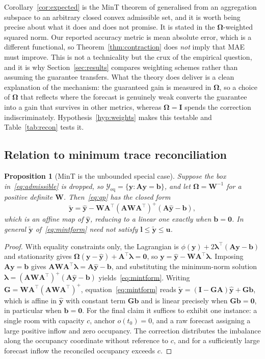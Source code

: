 \documentclass[11pt]{article}
\theoremstyle{plain}
\newtheorem{proposition}[theorem]{Proposition}
\theoremstyle{definition}
\theoremstyle{remark}
\newcommand{\bA}{\bm{A}}
\newcommand{\by}{\bm{y}}
\newcommand{\bb}{\bm{b}}
\newcommand{\bOm}{\bm{\Omega}}
\newcommand{\yhat}{\hat{\by}}
\newcommand{\ytil}{\tilde{\by}}
\newcommand{\cY}{\mathcal{Y}}
\newif\ifrevisionmarkup
\newcommand{\new}[1]{\ifrevisionmarkup\textcolor{revision}{#1}\else#1\fi}
\begin{document}
Corollary~\ref{cor:expected} is the MinT theorem of \citet{wickramasuriya2019mint} generalised from an aggregation subspace to an arbitrary closed convex admissible set, and it is worth being precise about what it does and does not promise. It is stated in the $\bOm$-weighted squared norm. Our reported accuracy metric is mean absolute error, which is a different functional, so Theorem~\ref{thm:contraction} does \emph{not} imply that MAE must improve. This is not a technicality but the crux of the empirical question, and it is why Section~\ref{sec:results} compares weighting schemes rather than assuming the guarantee transfers. What the theory does deliver is a clean explanation of the mechanism: the guaranteed gain is measured in $\bOm$, so a choice of $\bOm$ that reflects where the forecast is genuinely weak converts the guarantee into a gain that survives in other metrics, whereas $\bOm = \bm{I}$ spends the correction indiscriminately. Hypothesis~\ref{hyp:weights} makes this testable and Table~\ref{tab:recon} tests it.

\subsection{Relation to minimum trace reconciliation}

\begin{proposition}[MinT is the unbounded special case]
\label{prop:mint}
Suppose the box in~\eqref{eq:admissible} is dropped, so $\cY_{\mathrm{eq}} = \{\by : \bA\by=\bb\}$, and let $\bOm = \bm{W}^{-1}$ for a positive definite $\bm{W}$. Then~\eqref{eq:qp} has the closed form
\begin{equation}
\ytil = \yhat - \bm{W}\bA^{\top}\left(\bA\bm{W}\bA^{\top}\right)^{+}\left(\bA\yhat - \bb\right),
\label{eq:mintform}
\end{equation}
which is an \new{affine} map of $\yhat$, \new{reducing to a linear one exactly when $\bb = \bm{0}$}. In general $\ytil$ of~\eqref{eq:mintform} need not satisfy $\bm{l}\le\ytil\le\bm{u}$.
\end{proposition}
\begin{proof}
With equality constraints only, the Lagrangian is $\phi(\by) + 2\bm{\lambda}^{\top}(\bA\by-\bb)$ and stationarity gives $\bOm(\by-\yhat) + \bA^{\top}\bm{\lambda} = \bm{0}$, so $\by = \yhat - \bm{W}\bA^{\top}\bm{\lambda}$. Imposing $\bA\by=\bb$ gives $\bA\bm{W}\bA^{\top}\bm{\lambda} = \bA\yhat - \bb$, and substituting the minimum-norm solution $\bm{\lambda} = (\bA\bm{W}\bA^{\top})^{+}(\bA\yhat-\bb)$ yields~\eqref{eq:mintform}. \new{Writing $\bm{G} = \bm{W}\bA^{\top}(\bA\bm{W}\bA^{\top})^{+}$, equation~\eqref{eq:mintform} reads $\ytil = (\bm{I}-\bm{G}\bA)\yhat + \bm{G}\bb$, which is affine in $\yhat$ with constant term $\bm{G}\bb$ and is linear precisely when $\bm{G}\bb = \bm{0}$, in particular when $\bb = \bm{0}$.} For the final claim it suffices to exhibit one instance: a single room with capacity $c$, anchor $o(t_0)=0$, and a raw forecast assigning a large positive inflow and zero occupancy. The correction distributes the imbalance along the occupancy coordinate without reference to $c$, and for a sufficiently large forecast inflow the reconciled occupancy exceeds $c$.
\end{proof}
\end{document}
